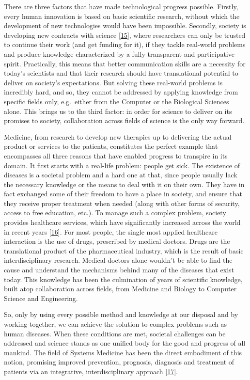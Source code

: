 \documentclass[
  12pt,
]{book}
\begin{document}
There are three factors that have made technological progress possible.
Firstly, every human innovation is based on basic scientific research, without which the development of new technologies would have been impossible.
Secondly, society is developing new contracts with science {[}\protect\hyperlink{ref-Gibbons1999}{15}{]}, where researchers can only be trusted to continue their work (and get funding for it), if they tackle real-world problems and produce knowledge characterized by a fully transparent and participative spirit.
Practically, this means that better communication skills are a necessity for today's scientists and that their research should have translational potential to deliver on society's expectations.
But solving these real-world problems is incredibly hard, and so, they cannot be addressed by applying knowledge from specific fields only, e.g.~either from the Computer or the Biological Sciences alone.
This brings us to the third factor: in order for science to deliver on its promises to society, collaboration across fields of science is the only way forward.

Medicine, from research to develop new therapies up to delivering the actual product or services to the patients, constitutes the perfect example that encompasses all three reasons that have enabled progress to transpire in its domain.
It first starts with a real-life problem: people get sick.
The existence of diseases is a societal problem and a hard one at that, since people usually lack the necessary knowledge or the means to deal with it on their own.
They have in fact exchanged some of their freedom to have a place in society, and ensure that they receive proper treatment when needed (along with other forms of security, access to free education, etc.).
To manage such a complex problem, society provides healthcare services, which have significantly increased across the world in recent years {[}\protect\hyperlink{ref-HAQ2015}{16}{]}.
For most people, the single most applied healthcare interaction is the use of drugs, prescribed by medical doctors.
Drugs are the translational product of the pharmaceutical industry, which is the result of basic interdisciplinary research.
Medical doctors alone wouldn't be able to find the cause and understand the mechanisms behind many of the diseases that exist today.
This knowledge has been the culmination of years of scientific knowledge, built atop collaboration across fields, from Medicine and Biology to Computer Science and Engineering.

So, only by using every possible method and knowledge at our disposal and by working together, we can achieve the solution to complex problems such as human diseases.
When these conditions are met, societal challenges can be addressed and science stands as one unified body for the good and progress of all mankind.
The field of Systems Medicine has been the direct embodiment of this notion, promising improved prevention, prognosis, diagnosis and treatment of patients via an integrative, interdisciplinary approach {[}\protect\hyperlink{ref-Apweiler2018}{17}{]}.
\end{document}
